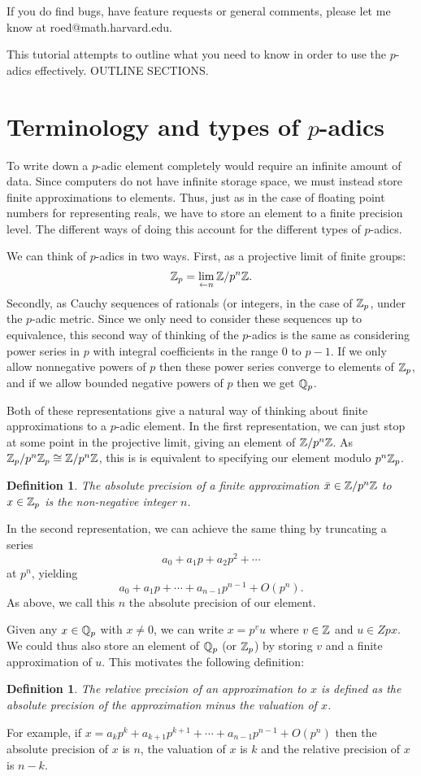 \documentclass[12pt]{article}
\newtheorem{definition}[theorem]{Definition}
\begin{document}
If you do find bugs, have feature requests or general comments, please let me know
at roed@math.harvard.edu.

This tutorial attempts to outline what you need to know in order to use
the $p$-adics effectively.  OUTLINE SECTIONS.

\section{Terminology and types of $p$-adics}

To write down a $p$-adic element completely would require an infinite amount of data.
Since computers do not have infinite storage space, we must instead store finite
approximations to elements.  Thus, just as in the case of floating point numbers for
representing reals, we have to store an element to a finite precision level.
The different ways of doing this account for the different types of $p$-adics.

We can think of $p$-adics in two ways.  First, as a projective limit of finite groups:
$$\mathbb{Z}_p = \lim_{\leftarrow n} \mathbb{Z} / p^n\mathbb{Z}.$$
Secondly, as Cauchy sequences of rationals (or integers, in the case of $\mathbb{Z}_p$, under the
$p$-adic metric.  Since we only need to consider these sequences up to equivalence, this
second way of thinking of the $p$-adics is the same as considering power series in $p$ with
integral coefficients in the range $0$ to $p-1$.  If we only allow nonnegative powers of $p$
then these power series converge to elements of $\mathbb{Z}_p$, and if we allow bounded negative powers
of $p$ then we get $\mathbb{Q}_p$.

Both of these representations give a natural way of thinking about finite approximations to a
$p$-adic element.  In the first representation, we can just stop at some point
in the projective limit, giving an element of $\mathbb{Z} / p^n\mathbb{Z}$.  As $\mathbb{Z}_p / p^n\mathbb{Z}_p \cong \mathbb{Z} / p^n\mathbb{Z}$,
this is is equivalent to specifying our element modulo $p^n\mathbb{Z}_p$.
\begin{definition}
The \emph{absolute precision} of a finite approximation $\bar{x} \in \mathbb{Z} / p^n\mathbb{Z}$ to $x \in \mathbb{Z}_p$
is the non-negative integer $n$.
\end{definition}
In the second representation, we can achieve the same thing by truncating a series 
$$a_0 + a_1 p + a_2 p^2 + \cdots$$
at $p^n$, yielding
$$a_0 + a_1 p + \cdots + a_{n-1} p^{n-1} + O(p^n).$$
As above, we call this $n$ the absolute precision of our element.

Given any $x \in \mathbb{Q}_p$ with $x \ne 0$, we can write $x = p^v u$ where $v \in \mathbb{Z}$ and $u \in Zpx$.
We could thus also store an element of $\mathbb{Q}_p$ (or $\mathbb{Z}_p$) by storing $v$ and a finite approximation
of $u$.  This motivates the following definition:
\begin{definition}
The \emph{relative precision} of an approximation to $x$ is defined as the absolute precision
of the approximation minus the valuation of $x$.
\end{definition}
For example, if $x = a_k p^k + a_{k+1} p^{k+1} + \cdots + a_{n-1} p^{n-1} + O(p^n)$  then the
absolute precision of $x$ is $n$, the valuation of $x$ is $k$ and the relative precision of $x$
is $n-k$.
\end{document}
